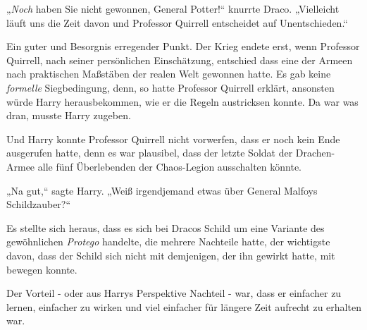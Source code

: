 „\emph{Noch} haben Sie nicht gewonnen, General Potter!“ knurrte Draco. „Vielleicht läuft uns die Zeit davon und Professor Quirrell entscheidet auf Unentschieden.“

Ein guter und Besorgnis erregender Punkt. Der Krieg endete erst, wenn Professor Quirrell, nach seiner persönlichen Einschätzung, entschied dass eine der Armeen nach praktischen Maßstäben der realen Welt gewonnen hatte. Es gab keine \emph{formelle} Siegbedingung, denn, so hatte Professor Quirrell erklärt, ansonsten würde Harry herausbekommen, wie er die Regeln austricksen konnte. Da war was dran, musste Harry zugeben.

Und Harry konnte Professor Quirrell nicht vorwerfen, dass er noch kein Ende ausgerufen hatte, denn es war plausibel, dass der letzte Soldat der Drachen-Armee alle fünf Überlebenden der Chaos-Legion ausschalten könnte.

„Na gut,“ sagte Harry. „Weiß irgendjemand etwas über General Malfoys Schildzauber?“

Es stellte sich heraus, dass es sich bei Dracos Schild um eine Variante des gewöhnlichen \emph{Protego} handelte, die mehrere Nachteile hatte, der wichtigste davon, dass der Schild sich nicht mit demjenigen, der ihn gewirkt hatte, mit bewegen konnte.

Der Vorteil - oder aus Harrys Perspektive Nachteil - war, dass er einfacher zu lernen, einfacher zu wirken und viel einfacher für längere Zeit aufrecht zu erhalten war.

